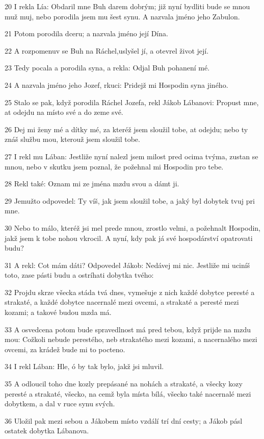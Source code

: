 \par 20 I rekla Lía: Obdaril mne Buh darem dobrým; již nyní bydliti bude se mnou muž muj, nebo porodila jsem mu šest synu. A nazvala jméno jeho Zabulon.
\par 21 Potom porodila dceru; a nazvala jméno její Dína.
\par 22 A rozpomenuv se Buh na Ráchel,uslyšel jí, a otevrel život její.
\par 23 Tedy pocala a porodila syna, a rekla: Odjal Buh pohanení mé.
\par 24 A nazvala jméno jeho Jozef, rkuci: Pridejž mi Hospodin syna jiného.
\par 25 Stalo se pak, když porodila Ráchel Jozefa, rekl Jákob Lábanovi: Propust mne, at odejdu na místo své a do zeme své.
\par 26 Dej mi ženy mé a dítky mé, za kteréž jsem sloužil tobe, at odejdu; nebo ty znáš službu mou, kterouž jsem sloužil tobe.
\par 27 I rekl mu Lában: Jestliže nyní nalezl jsem milost pred ocima tvýma, zustan se mnou, nebo v skutku jsem poznal, že požehnal mi Hospodin pro tebe.
\par 28 Rekl také: Oznam mi ze jména mzdu svou a dámt ji.
\par 29 Jemužto odpovedel: Ty víš, jak jsem sloužil tobe, a jaký byl dobytek tvuj pri mne.
\par 30 Nebo to málo, kteréž jsi mel prede mnou, zrostlo velmi, a požehnalt Hospodin, jakž jsem k tobe nohou vkrocil. A nyní, kdy pak já své hospodárství opatrovati budu?
\par 31 A rekl: Cot mám dáti? Odpovedel Jákob: Nedávej mi nic. Jestliže mi uciníš toto, zase pásti budu a ostríhati dobytka tvého:
\par 32 Projdu skrze všecka stáda tvá dnes, vymešuje z nich každé dobytce peresté a strakaté, a každé dobytce nacernalé mezi ovcemi, a strakaté a peresté mezi kozami; a takové budou mzda má.
\par 33 A osvedcena potom bude spravedlnost má pred tebou, když prijde na mzdu mou: Cožkoli nebude perestého, neb strakatého mezi kozami, a nacernalého mezi ovcemi, za krádež bude mi to pocteno.
\par 34 I rekl Lában: Hle, ó by tak bylo, jakž jsi mluvil.
\par 35 A odloucil toho dne kozly prepásané na nohách a strakaté, a všecky kozy peresté a strakaté, všecko, na cemž byla místa bílá, všecko také nacernalé mezi dobytkem, a dal v ruce synu svých.
\par 36 Uložil pak mezi sebou a Jákobem místo vzdálí trí dní cesty; a Jákob pásl ostatek dobytka Lábanova.
